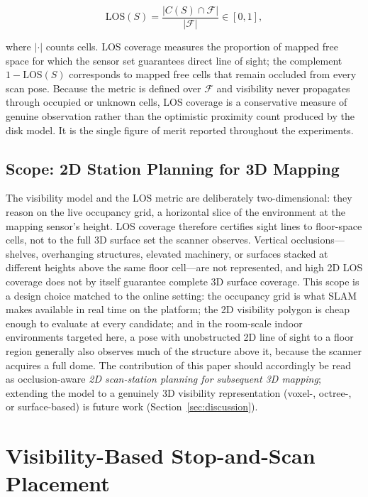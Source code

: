 \documentclass[sensors,article,submit,pdftex,moreauthors]{Definitions/mdpi}
\begin{document}
\begin{equation}
\mathrm{LOS}(S)=\frac{\lvert C(S)\cap\mathcal{F}\rvert}{\lvert\mathcal{F}\rvert}\in[0,1],
\end{equation}

where $\lvert\cdot\rvert$ counts cells. LOS coverage measures the proportion of
mapped free space for which the sensor set guarantees direct line of sight; the
complement $1-\mathrm{LOS}(S)$ corresponds to mapped free cells that remain
occluded from every scan pose. Because the metric is defined over $\mathcal{F}$
and visibility never propagates through occupied or unknown cells, LOS coverage
is a conservative measure of genuine observation rather than the optimistic
proximity count produced by the disk model. It is the single figure of merit
reported throughout the experiments.

\subsection{Scope: 2D Station Planning for 3D Mapping}
\label{sec:scope2d}

The visibility model and the LOS metric are deliberately two-dimensional: they
reason on the live occupancy grid, a horizontal slice of the environment at the
mapping sensor's height. LOS coverage therefore certifies sight lines to
floor-space cells, not to the full 3D surface set the scanner observes.
Vertical occlusions---shelves, overhanging structures, elevated machinery, or
surfaces stacked at different heights above the same floor cell---are not
represented, and high 2D LOS coverage does not by itself guarantee complete 3D
surface coverage. This scope is a design choice matched to the online setting:
the occupancy grid is what SLAM makes available in real time on the platform;
the 2D visibility polygon is cheap enough to evaluate at every candidate; and
in the room-scale indoor environments targeted here, a pose with unobstructed
2D line of sight to a floor region generally also observes much of the
structure above it, because the scanner acquires a full dome. The contribution
of this paper should accordingly be read as occlusion-aware \emph{2D
scan-station planning for subsequent 3D mapping}; extending the model to a
genuinely 3D visibility representation (voxel-, octree-, or surface-based) is
future work (Section~\ref{sec:discussion}).

\section{Visibility-Based Stop-and-Scan Placement}
\label{sec:placement}
\end{document}
